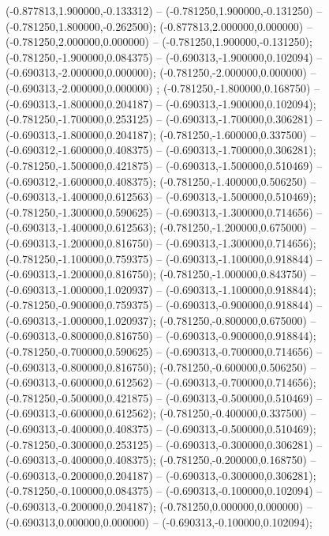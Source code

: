  (-0.877813,1.900000,-0.133312) -- (-0.781250,1.900000,-0.131250) -- (-0.781250,1.800000,-0.262500);
 (-0.877813,2.000000,0.000000) -- (-0.781250,2.000000,0.000000) -- (-0.781250,1.900000,-0.131250);
 (-0.781250,-1.900000,0.084375) -- (-0.690313,-1.900000,0.102094) -- (-0.690313,-2.000000,0.000000);
 (-0.781250,-2.000000,0.000000) -- (-0.690313,-2.000000,0.000000) ;
 (-0.781250,-1.800000,0.168750) -- (-0.690313,-1.800000,0.204187) -- (-0.690313,-1.900000,0.102094);
 (-0.781250,-1.700000,0.253125) -- (-0.690313,-1.700000,0.306281) -- (-0.690313,-1.800000,0.204187);
 (-0.781250,-1.600000,0.337500) -- (-0.690312,-1.600000,0.408375) -- (-0.690313,-1.700000,0.306281);
 (-0.781250,-1.500000,0.421875) -- (-0.690313,-1.500000,0.510469) -- (-0.690312,-1.600000,0.408375);
 (-0.781250,-1.400000,0.506250) -- (-0.690313,-1.400000,0.612563) -- (-0.690313,-1.500000,0.510469);
 (-0.781250,-1.300000,0.590625) -- (-0.690313,-1.300000,0.714656) -- (-0.690313,-1.400000,0.612563);
 (-0.781250,-1.200000,0.675000) -- (-0.690313,-1.200000,0.816750) -- (-0.690313,-1.300000,0.714656);
 (-0.781250,-1.100000,0.759375) -- (-0.690313,-1.100000,0.918844) -- (-0.690313,-1.200000,0.816750);
 (-0.781250,-1.000000,0.843750) -- (-0.690313,-1.000000,1.020937) -- (-0.690313,-1.100000,0.918844);
 (-0.781250,-0.900000,0.759375) -- (-0.690313,-0.900000,0.918844) -- (-0.690313,-1.000000,1.020937);
 (-0.781250,-0.800000,0.675000) -- (-0.690313,-0.800000,0.816750) -- (-0.690313,-0.900000,0.918844);
 (-0.781250,-0.700000,0.590625) -- (-0.690313,-0.700000,0.714656) -- (-0.690313,-0.800000,0.816750);
 (-0.781250,-0.600000,0.506250) -- (-0.690313,-0.600000,0.612562) -- (-0.690313,-0.700000,0.714656);
 (-0.781250,-0.500000,0.421875) -- (-0.690313,-0.500000,0.510469) -- (-0.690313,-0.600000,0.612562);
 (-0.781250,-0.400000,0.337500) -- (-0.690313,-0.400000,0.408375) -- (-0.690313,-0.500000,0.510469);
 (-0.781250,-0.300000,0.253125) -- (-0.690313,-0.300000,0.306281) -- (-0.690313,-0.400000,0.408375);
 (-0.781250,-0.200000,0.168750) -- (-0.690313,-0.200000,0.204187) -- (-0.690313,-0.300000,0.306281);
 (-0.781250,-0.100000,0.084375) -- (-0.690313,-0.100000,0.102094) -- (-0.690313,-0.200000,0.204187);
 (-0.781250,0.000000,0.000000) -- (-0.690313,0.000000,0.000000) -- (-0.690313,-0.100000,0.102094);
